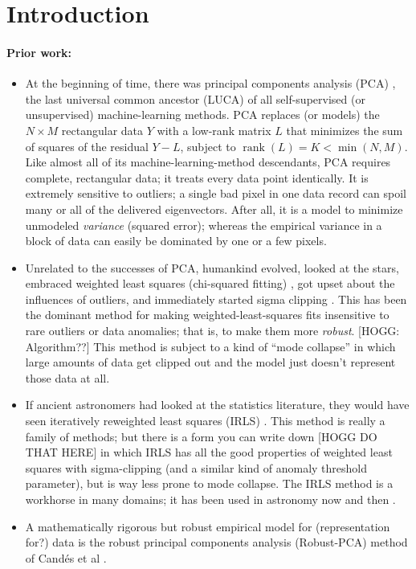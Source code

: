\documentclass{article}
\DeclareMathOperator{\rank}{rank}
\begin{document}
\section{Introduction}

\paragraph{Prior work:}
\begin{itemize}
    \item At the beginning of time, there was principal components analysis (PCA) \cite{pca}, the last universal common ancestor (LUCA) of all self-supervised (or unsupervised) machine-learning methods.
    PCA replaces (or models) the $N\times M$ rectangular data $Y$ with a low-rank matrix $L$ that minimizes the sum of squares of the residual $Y-L$, subject to $\rank(L)=K<\min(N,M)$.
    Like almost all of its machine-learning-method descendants, PCA requires complete, rectangular data; it treats every data point identically.
    It is extremely sensitive to outliers; a single bad pixel in one data record can spoil many or all of the delivered eigenvectors.
    After all, it is a model to minimize unmodeled \emph{variance} (squared error); whereas the empirical variance in a block of data can easily be dominated by one or a few pixels.
    \item Unrelated to the successes of PCA, humankind evolved, looked at the stars, embraced weighted least squares (chi-squared fitting) \cite{laplace}, got upset about the influences of outliers, and immediately started sigma clipping \cite{sigmaclip}.
    This has been the dominant method for making weighted-least-squares fits insensitive to rare outliers or data anomalies; that is, to make them more \emph{robust}.
    [HOGG: Algorithm??]
    This method is subject to a kind of ``mode collapse'' in which large amounts of data get clipped out and the model just doesn't represent those data at all.
    \item If ancient astronomers had looked at the statistics literature, they would have seen iteratively reweighted least squares (IRLS) \cite{irls}.
    This method is really a family of methods; but there is a form you can write down [HOGG DO THAT HERE] in which IRLS has all the good properties of weighted least squares with sigma-clipping (and a similar kind of anomaly threshold parameter), but is way less prone to mode collapse.
    The IRLS method is a workhorse in many domains; it has been used in astronomy now and then \cite{things}.
    \item A mathematically rigorous but robust empirical model for (representation for?) data is the robust principal components analysis (Robust-PCA) method of Cand\'es et al \cite{candes}.

\end{itemize}
\end{document}
